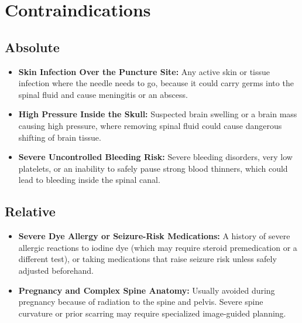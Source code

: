 \section{Contraindications}

\subsection{Absolute}
\begin{itemize}
    \item \textbf{Skin Infection Over the Puncture Site:} Any active skin or tissue infection where the needle needs to go, because it could carry germs into the spinal fluid and cause meningitis or an abscess.
    \item \textbf{High Pressure Inside the Skull:} Suspected brain swelling or a brain mass causing high pressure, where removing spinal fluid could cause dangerous shifting of brain tissue.
    \item \textbf{Severe Uncontrolled Bleeding Risk:} Severe bleeding disorders, very low platelets, or an inability to safely pause strong blood thinners, which could lead to bleeding inside the spinal canal.
\end{itemize}

\subsection{Relative}
\begin{itemize}
    \item \textbf{Severe Dye Allergy or Seizure-Risk Medications:} A history of severe allergic reactions to iodine dye (which may require steroid premedication or a different test), or taking medications that raise seizure risk unless safely adjusted beforehand.
    \item \textbf{Pregnancy and Complex Spine Anatomy:} Usually avoided during pregnancy because of radiation to the spine and pelvis. Severe spine curvature or prior scarring may require specialized image-guided planning.
\end{itemize}


